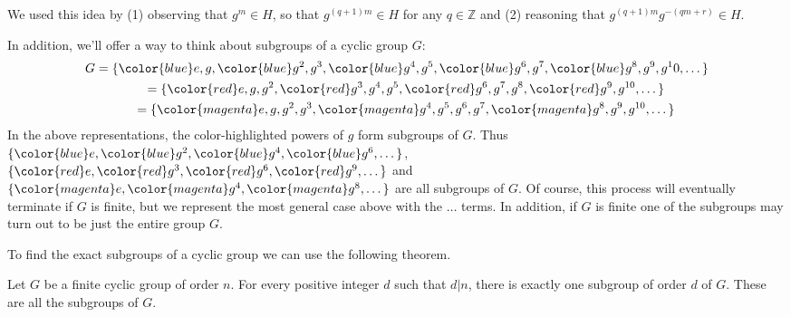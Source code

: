 \documentclass[12pt,letterpaper]{algebra_book}
\theoremstyle{definition}
\begin{document}
    We used this idea by (1) observing that $g^m \in H$, so that
    $g^{(q+1)m} \in H$ for any $q \in \mathbb{Z}$ and (2) reasoning
    that $g^{(q+1)m}g^{-(qm + r)} \in H$.

    In addition, we'll offer a way to think about subgroups of a
    cyclic group $G$:
    \begin{gather}
        G = \{{\color{blue}e}, g, {\color{blue}g^2}, g^3, {\color{blue}g^4}, g^5, {\color{blue}g^6}, g^7, {\color{blue}g^8}, g^9, g^10, \dots\}\\
          \hspace{0.5cm}= \{{\color{red}e}, g, g^2, {\color{red}g^3}, g^4, g^5, {\color{red}g^6}, g^7, g^8, {\color{red}g^9}, g^{10}, \dots\}\\
          \hspace{0.5cm}= \{{\color{magenta}e}, g, g^2, g^3, {\color{magenta}g^4}, g^5, g^6, g^7, {\color{magenta}g^8}, g^9, g^{10}, \dots\}
    \end{gather}
    In the above representations, the color-highlighted powers of $g$
    form subgroups of $G$. Thus $\{{\color{blue}e}, {\color{blue}g^2},
    {\color{blue}g^4}, {\color{blue}g^6}, \dots\}$, 
    $\{{\color{red}e}, {\color{red}g^3},
    {\color{red}g^6}, {\color{red}g^9}, \dots \}$ and $\{{\color{magenta}e}, {\color{magenta}g^4},
    {\color{magenta}g^8}, \dots\}$ are
    all subgroups of $G$. Of course, this process will eventually terminate if
    $G$ is finite, but we represent the most general case above with
    the $\dots$ terms. In addition, if $G$ is finite one of the
    subgroups may turn out to be just the entire group $G$. 

    To find the exact subgroups of a cyclic group we can use the
    following theorem. 

    \begin{thm}
        Let $G$ be a finite cyclic group of order $n$. For every positive
        integer $d$ such that $d|n$, there is exactly one subgroup of
        order $d$ of $G$. These are all the subgroups of $G$. 
    \end{thm} 
\end{document}
